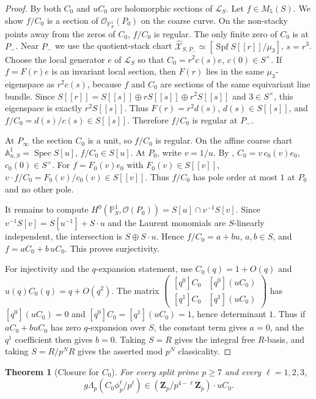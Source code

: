 \documentclass[11pt]{amsart}
\newtheorem{theorem}{Theorem}[section]
\theoremstyle{definition}
\theoremstyle{remark}
\newcommand{\Z}{\mathbf{Z}}
\begin{document}
\begin{proof}
By  both $C_0$ and $uC_0$ are holomorphic sections of $\mathcal L_S$. Let $f\in M_5(S)$. We show $f/C_0$ is a section of $\mathcal O_{\mathbb P^1_S}(P_0)$ on the coarse curve. On the non-stacky points away from the zeros of $C_0$, $f/C_0$ is regular. The only finite zero of $C_0$ is at $P_-$. Near $P_-$ we use the quotient-stack chart $\widehat{\mathcal X}_{S,P_-}\simeq[\operatorname{Spf}S[[r]]/\mu_3]$, $s=r^3$. Choose the local generator $e$ of $\mathcal L_S$ so that $C_0=r^2c(s)e$, $c(0)\in S^\times$. If $f=F(r)e$ is an invariant local section, then $F(r)$ lies in the same $\mu_3$-eigenspace as $r^2c(s)$, because $f$ and $C_0$ are sections of the same equivariant line bundle. Since $S[[r]]=S[[s]]\oplus rS[[s]]\oplus r^2 S[[s]]$ and $3\in S^\times$, this eigenspace is exactly $r^2 S[[s]]$. Thus $F(r)=r^2 d(s)$, $d(s)\in S[[s]]$, and $f/C_0=d(s)/c(s)\in S[[s]]$. Therefore $f/C_0$ is regular at $P_-$.

At $P_\infty$ the section $C_0$ is a unit, so $f/C_0$ is regular. On the affine coarse chart $\mathbb A^1_{u,S}=\operatorname{Spec} S[u]$, $f/C_0\in S[u]$. At $P_0$, write $v=1/u$. By , $C_0=v\,c_0(v)e_0$, $c_0(0)\in S^\times$. For $f=F_0(v)e_0$ with $F_0(v)\in S[[v]]$, $v\cdot f/C_0=F_0(v)/c_0(v)\in S[[v]]$. Thus $f/C_0$ has pole order at most $1$ at $P_0$ and no other pole.

It remains to compute $H^0(\mathbb P^1_S,\mathcal O(P_0))=S[u]\cap v^{-1}S[v]$. Since $v^{-1}S[v]=S[u^{-1}]+S\cdot u$ and the Laurent monomials are $S$-linearly independent, the intersection is $S\oplus S\cdot u$. Hence $f/C_0=a+bu$, $a,b\in S$, and $f=aC_0+b\,uC_0$. This proves surjectivity.

For injectivity and the $q$-expansion statement, use $C_0(q)=1+O(q)$ and $u(q)C_0(q)=q+O(q^2)$. The matrix $\begin{pmatrix}[q^0]C_0 & [q^0](uC_0)\\ [q^1]C_0 & [q^1](uC_0)\end{pmatrix}$ has $[q^0](uC_0)=0$ and $[q^0]C_0=[q^1](uC_0)=1$, hence determinant $1$. Thus if $aC_0+buC_0$ has zero $q$-expansion over $S$, the constant term gives $a=0$, and the $q^1$ coefficient then gives $b=0$. Taking $S=R$ gives the integral free $R$-basis, and taking $S=R/p^N R$ gives the asserted mod $p^N$ classicality.
\end{proof}

\begin{theorem}[Closure for $C_0$]\label{thm:KB-closed}
For every split prime $p\ge 7$ and every $\ell=1,2,3$,
\[
g\Lambda_p(C_0\phi_p^\ell/p^\ell)\in(\Z_p/p^{4-\ell}\Z_p)\cdot uC_0.
\]
\end{theorem}
\end{document}
